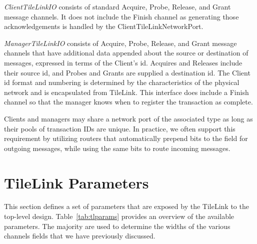 {\em ClientTileLinkIO} consists of standard Acquire, Probe, Release, and Grant message channels.
It does not include the Finish channel as generating those acknowledgements is handled by the ClientTileLinkNetworkPort.

{\em ManagerTileLinkIO} consists of Acquire, Probe, Release, and Grant message channels that have additional data appended about the source or destination of messages, expressed in terms of the Client's id.
Acquires and Releases include their source id, and Probes and Grants are supplied a destination id.
The Client id format and numbering is determined by the characteristics of the physical network and is encapsulated from TileLink.
This interface does include a Finish channel so that the manager knows when to register the transaction as complete.

Clients and managers may share a network port of the associated type as long as their pools of transaction IDs are unique.
In practice, we often support this requirement by utilizing routers that automatically prepend bits to the  field
for outgoing messages, while using the same bits to route incoming messages.

\section{TileLink Parameters}

This section defines a set of parameters that are exposed by the TileLink to the top-level design.
Table~\ref{tab:tlparams} provides an overview of the available parameters.
The majority are used to determine the widths of the various channels fields that we have previously discussed.

